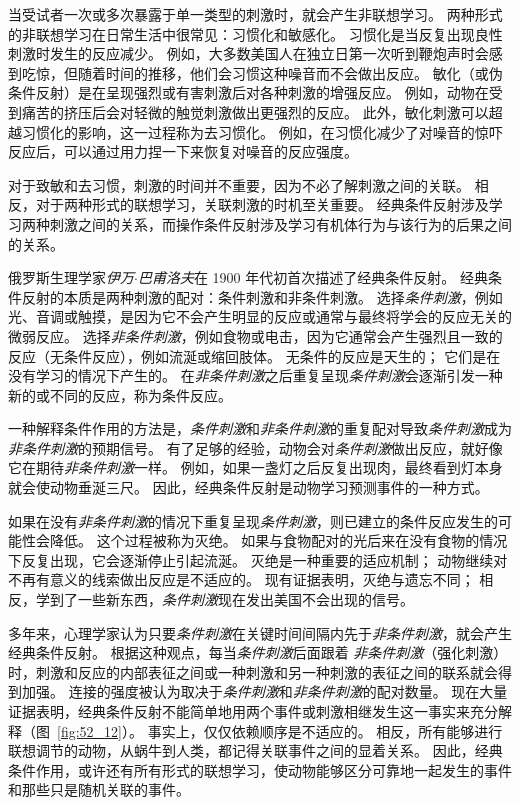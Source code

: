当受试者一次或多次暴露于单一类型的刺激时，就会产生非联想学习。
两种形式的非联想学习在日常生活中很常见：习惯化和敏感化。
习惯化是当反复出现良性刺激时发生的反应减少。
例如，大多数美国人在独立日第一次听到鞭炮声时会感到吃惊，但随着时间的推移，他们会习惯这种噪音而不会做出反应。
敏化（或伪条件反射）是在呈现强烈或有害刺激后对各种刺激的增强反应。
例如，动物在受到痛苦的挤压后会对轻微的触觉刺激做出更强烈的反应。
此外，敏化刺激可以超越习惯化的影响，这一过程称为去习惯化。
例如，在习惯化减少了对噪音的惊吓反应后，可以通过用力捏一下来恢复对噪音的反应强度。


对于致敏和去习惯，刺激的时间并不重要，因为不必了解刺激之间的关联。
相反，对于两种形式的联想学习，关联刺激的时机至关重要。
经典条件反射涉及学习两种刺激之间的关系，而操作条件反射涉及学习有机体行为与该行为的后果之间的关系。


俄罗斯生理学家\textit{伊万$\cdot$巴甫洛夫}在 1900 年代初首次描述了经典条件反射。
经典条件反射的本质是两种刺激的配对：条件刺激和非条件刺激。
选择\textit{条件刺激}，例如光、音调或触摸，是因为它不会产生明显的反应或通常与最终将学会的反应无关的微弱反应。
选择\textit{非条件刺激}，例如食物或电击，因为它通常会产生强烈且一致的反应（无条件反应），例如流涎或缩回肢体。
无条件的反应是天生的；
它们是在没有学习的情况下产生的。
在\textit{非条件刺激}之后重复呈现\textit{条件刺激}会逐渐引发一种新的或不同的反应，称为条件反应。


一种解释条件作用的方法是，\textit{条件刺激}和\textit{非条件刺激}的重复配对导致\textit{条件刺激}成为\textit{非条件刺激}的预期信号。
有了足够的经验，动物会对\textit{条件刺激}做出反应，就好像它在期待\textit{非条件刺激}一样。
例如，如果一盏灯之后反复出现肉，最终看到灯本身就会使动物垂涎三尺。
因此，经典条件反射是动物学习预测事件的一种方式。


如果在没有\textit{非条件刺激}的情况下重复呈现\textit{条件刺激}，则已建立的条件反应发生的可能性会降低。
这个过程被称为灭绝。
如果与食物配对的光后来在没有食物的情况下反复出现，它会逐渐停止引起流涎。
灭绝是一种重要的适应机制；
动物继续对不再有意义的线索做出反应是不适应的。
现有证据表明，灭绝与遗忘不同；
相反，学到了一些新东西，\textit{条件刺激}现在发出美国不会出现的信号。


多年来，心理学家认为只要\textit{条件刺激}在关键时间间隔内先于\textit{非条件刺激}，就会产生经典条件反射。
根据这种观点，每当\textit{条件刺激}后面跟着 \textit{非条件刺激}（强化刺激）时，刺激和反应的内部表征之间或一种刺激和另一种刺激的表征之间的联系就会得到加强。
连接的强度被认为取决于\textit{条件刺激}和\textit{非条件刺激}的配对数量。
现在大量证据表明，经典条件反射不能简单地用两个事件或刺激相继发生这一事实来充分解释（图~\ref{fig:52_12}）。
事实上，仅仅依赖顺序是不适应的。
相反，所有能够进行联想调节的动物，从蜗牛到人类，都记得关联事件之间的显着关系。
因此，经典条件作用，或许还有所有形式的联想学习，使动物能够区分可靠地一起发生的事件和那些只是随机关联的事件。


